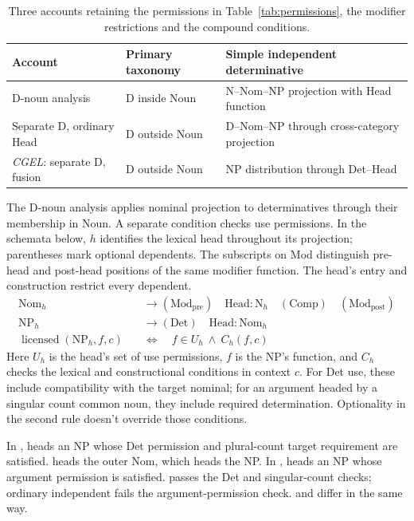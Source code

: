 \documentclass[12pt]{article}
\begin{document}
\begin{table}[H]
\centering\small
\caption{Three accounts retaining the permissions in Table~\ref{tab:permissions}, the modifier restrictions and the compound conditions.}\label{tab:economy}
\begin{tabular}{>{\raggedright\arraybackslash}p{3.1cm}>{\raggedright\arraybackslash}p{3.9cm}>{\raggedright\arraybackslash}p{4.7cm}}
\toprule
Account & Primary taxonomy & Simple independent determinative \\
\midrule
D-noun analysis & D inside Noun & N--Nom--NP projection with Head function \\
Separate D, ordinary Head & D outside Noun & D--Nom--NP through cross-category projection \\
\textit{CGEL}: separate D, fusion & D outside Noun & NP distribution through Det--Head \\
\bottomrule
\end{tabular}
\end{table}

The D-noun analysis applies nominal projection to determinatives through their membership in Noun. A separate condition checks use permissions. In the schemata below, $h$ identifies the lexical head throughout its projection; parentheses mark optional dependents. The subscripts on Mod distinguish pre-head and post-head positions of the same modifier function. The head's entry and construction restrict every dependent.
\[
\begin{aligned}
\mathrm{Nom}_{h} &\to (\mathrm{Mod}_{\mathrm{pre}})\quad \mathrm{Head}:\mathrm{N}_{h}\quad (\mathrm{Comp})\quad (\mathrm{Mod}_{\mathrm{post}}) \\
\mathrm{NP}_{h} &\to (\mathrm{Det})\quad \mathrm{Head}:\mathrm{Nom}_{h} \\
\operatorname{licensed}(\mathrm{NP}_{h},f,c)\quad &\Longleftrightarrow\quad f\in U_h\ \land\ C_h(f,c)
\end{aligned}
\]
Here $U_h$ is the head's set of use permissions, $f$ is the NP's function, and $C_h$ checks the lexical and constructional conditions in context $c$. For Det use, these include compatibility with the target nominal; for an argument headed by a singular count common noun, they include required determination. Optionality in the second rule doesn't override those conditions.

In ,  heads an NP whose Det permission and plural-count target requirement are satisfied.  heads the outer Nom, which heads the NP. In ,  heads an NP whose argument permission is satisfied.  passes the Det and singular-count checks; ordinary independent  fails the argument-permission check.  and  differ in the same way.
\end{document}
